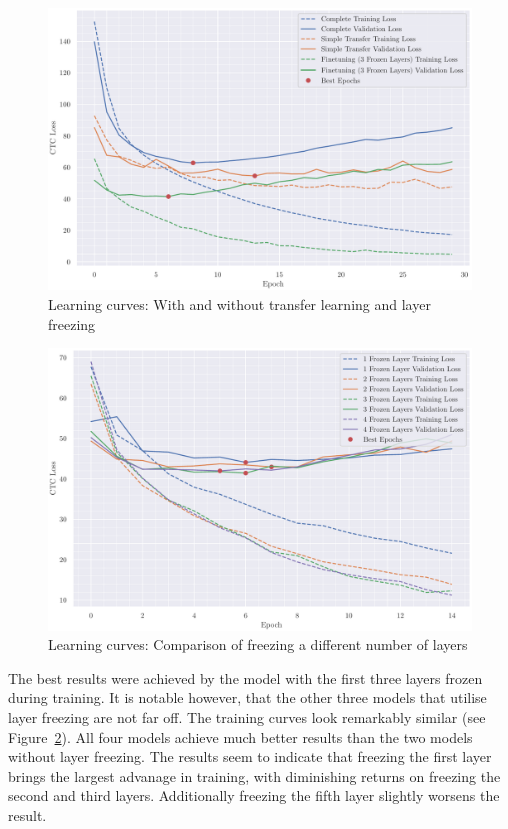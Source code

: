 \documentclass[12pt]{article}    %
\begin{document}
\begin{figure}[ht]
    \centering
    \includegraphics[width=\textwidth]{../3curves.pdf}
    \caption{Learning curves: With and without transfer learning and layer freezing}
    \label{fig:3c}
\end{figure}

\begin{figure}[ht]
    \centering
    \includegraphics[width=\textwidth]{../4curves.pdf}
    \caption{Learning curves: Comparison of freezing a different number of layers}
    \label{fig:4c}
\end{figure}

The best results were achieved by the model with the first three layers frozen during training. It is notable however, that the other three models that utilise layer freezing are not far off. The training curves look remarkably similar (see Figure~\ref{fig:4c}). All four models achieve much better results than the two models without layer freezing. The results seem to indicate that freezing the first layer brings the largest advanage in training, with diminishing returns on freezing the second and third layers. Additionally freezing the fifth layer slightly worsens the result.
\end{document}
